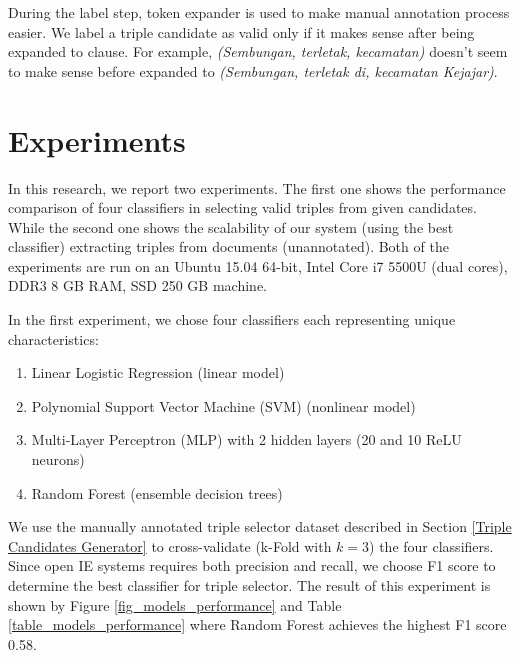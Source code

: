 \documentclass[conference,compsoc,12pt]{IEEEtran}
\begin{document}
During the label step, token expander is used to make manual annotation process easier. We label a triple candidate as valid only if it makes sense after being expanded to clause. For example, \textit{(Sembungan, terletak, kecamatan)} doesn't seem to make sense before expanded to \textit{(Sembungan, terletak di, kecamatan Kejajar)}.

\section{Experiments} \label{Experiments}

In this research, we report two experiments. The first one shows the performance comparison of four classifiers in selecting valid triples from given candidates. While the second one shows the scalability of our system (using the best classifier) extracting triples from documents (unannotated). Both of the experiments are run on an Ubuntu 15.04 64-bit, Intel Core i7 5500U (dual cores), DDR3 8 GB RAM, SSD 250 GB machine.

In the first experiment, we chose four classifiers each representing unique characteristics: 

\begin{enumerate}
\item Linear Logistic Regression\cite{fan2008liblinear} (linear model)
\item Polynomial Support Vector Machine (SVM)\cite{chang2011libsvm} (nonlinear model)
\item Multi-Layer Perceptron (MLP)\cite{hinton1989connectionist} with 2 hidden layers (20 and 10 ReLU\cite{nair2010rectified} neurons)
\item Random Forest\cite{wasserman2015grid} (ensemble decision trees)
\end{enumerate}
  
We use the manually annotated triple selector dataset described in Section \ref{Triple Candidates Generator} to cross-validate\cite{kohavi1995study} (k-Fold with $k=3$) the four classifiers. Since open IE systems requires both precision and recall\cite{angeli2015leveraging}, we choose F1 score to determine the best classifier for triple selector. The result of this experiment is shown by Figure \ref{fig_models_performance} and Table \ref{table_models_performance} where Random Forest achieves the highest F1 score 0.58.
\end{document}
